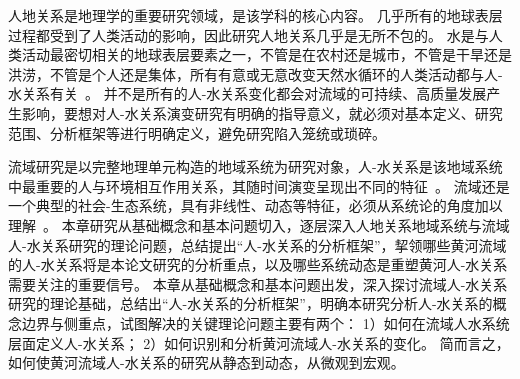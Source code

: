 
人地关系是地理学的重要研究领域，是该学科的核心内容\cite{zhang2022c}。
几乎所有的地球表层过程都受到了人类活动的影响，因此研究人地关系几乎是无所不包的。
水是与人类活动最密切相关的地球表层要素之一，不管是在农村还是城市，不管是干旱还是洪涝，不管是个人还是集体，所有有意或无意改变天然水循环的人类活动都与人-水关系有关~\cite{falkenmark2021}。
并不是所有的人-水关系变化都会对流域的可持续、高质量发展产生影响，要想对人-水关系演变研究有明确的指导意义，就必须对基本定义、研究范围、分析框架等进行明确定义，避免研究陷入笼统或琐碎。

流域研究是以完整地理单元构造的地域系统为研究对象，人-水关系是该地域系统中最重要的人与环境相互作用关系，其随时间演变呈现出不同的特征~\cite{wang2019d}。
流域还是一个典型的社会-生态系统，具有非线性、动态等特征，必须从系统论的角度加以理解~\cite{reyers2018,huggins2022}。
本章研究从基础概念和基本问题切入，逐层深入人地关系地域系统与流域人-水关系研究的理论问题，总结提出“人-水关系的分析框架”，挈领哪些黄河流域的人-水关系将是本论文研究的分析重点，以及哪些系统动态是重塑黄河人-水关系需要关注的重要信号。
本章从基础概念和基本问题出发，深入探讨流域人-水关系研究的理论基础，总结出“人-水关系的分析框架”，明确本研究分析人-水关系的概念边界与侧重点，试图解决的关键理论问题主要有两个：
1）如何在流域人水系统层面定义人-水关系；
2）如何识别和分析黄河流域人-水关系的变化。
简而言之，如何使黄河流域人-水关系的研究从静态到动态，从微观到宏观。
